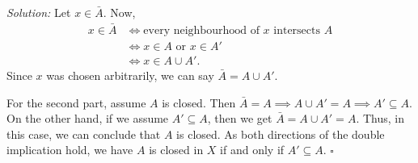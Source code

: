 
\emph{Solution:} Let $x\in\bar{A}$. Now,
\begin{align*}
  x\in\bar{A} &\iff \text{every neighbourhood of } x \text{ intersects } A\\
              &\iff x\in A \text{ or } x\in A'\\
              &\iff x\in A\cup A'.
\end{align*}
Since $x$ was chosen arbitrarily, we can say $\bar{A}=A\cup A'$.

For the second part, assume $A$ is closed. Then
$\bar{A}=A\implies A\cup A'=A\implies A'\subseteq A$. On the other hand, if we assume
$A'\subseteq A$, then we get $\bar{A}=A\cup A'=A$. Thus, in this case, we can conclude that $A$
is closed. As both directions of the double implication hold, we have $A$ is closed in $X$ if
and only if $A'\subseteq A$. \hfill$\square$
